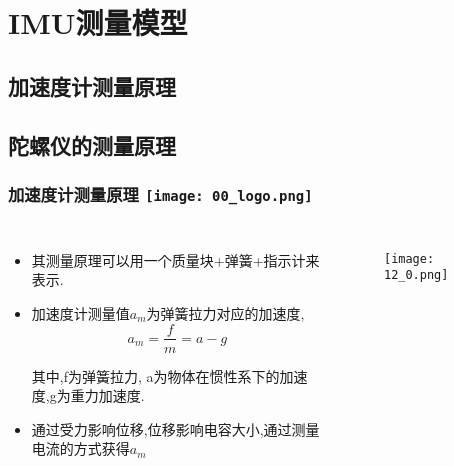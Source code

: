 \section{IMU测量模型}
\subsection{加速度计测量原理}
\subsection{陀螺仪的测量原理}


\begin{frame}
  \frametitle{加速度计测量原理 \hfill \texttt{[image: 00\_logo.png]}}
  \begin{columns}
    
    \begin{itemize}
      \item 其测量原理可以用一个质量块+弹簧+指示计来表示.
      \item 加速度计测量值$a_m$为弹簧拉力对应的加速度,
        \begin{equation}
          a_m = \frac{f}{m} = a - g
        \end{equation}
      
      其中,f为弹簧拉力, a为物体在惯性系下的加速度,g为重力加速度.
      
      \item 通过受力影响位移,位移影响电容大小,通过测量电流的方式获得$a_m$

    \end{itemize}

    \begin{figure}[h]
      \texttt{[image: 12\_0.png]}
    \end{figure}

  
  \end{columns}
  \end{frame}    



